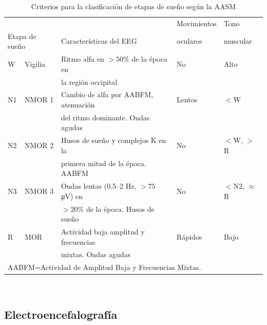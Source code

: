 \documentclass[12pt,letterpaper]{book}
\newcommand{\hz}{\si{\hertz}\xspace}
\newcommand{\mv}{\si{\micro\volt}\xspace}
\begin{document}
\begin{table}
\caption[Criterios para la clasificación de etapas de sueño]
{Criterios para la clasificación de etapas de sueño según la AASM}
\centering
{\small
\begin{tabular}{lllll}
\toprule
&&   & Movimientos & Tono \\
\multicolumn{2}{l}{Etapa de sueño}& Características del EEG & oculares & muscular \\
\midrule
 W  & Vigilia & {Ritmo alfa} en $>50$\% de la época en   & No & Alto \\
    &         & la región occipital                &    &      \\
 N1 & NMOR 1  & Cambio de alfa por AABFM, atenuación & Lentos & $<$W     \\
    &         & del ritmo dominante. Ondas agudas   &    &      \\
 N2 & NMOR 2  & Husos de sueño y complejos K en la    & No & $<$W, $>$R     \\
    &         & primera mitad de la época. AABFM &    &     \\
 N3 & NMOR 3  & {Ondas lentas} (0.5--2 \hz, $>75$ \mv) en& No & $<$N2, $\approx$R \\
    &         & $>20$\% de la época. Husos de sueño       &&      \\
 R  & MOR     & Actividad baja amplitud y frecuencias & Rápidos & Bajo  \\
    &         & mixtas. Ondas agudas             &       &       \\
\bottomrule
\multicolumn{4}{l}{AABFM=Actividad de Amplitud Baja y Frecuencias Mixtas.}
\end{tabular}\\
}
\label{cuadro:aasm}
\end{table}


\subsection{Electroencefalografía}
\label{sec:eeg}
\end{document}
